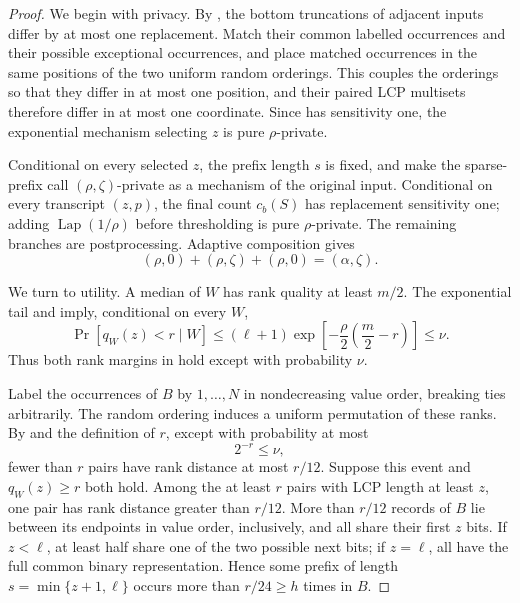 \documentclass[11pt]{article}
\begin{document}
\begin{proof}
We begin with privacy.  By , the bottom
truncations of adjacent inputs differ by at most one replacement.  Match
their common labelled occurrences and their possible exceptional
occurrences, and place matched occurrences in the same positions of the two
uniform random orderings.  This couples the orderings so that they differ in
at most one position, and their paired LCP multisets therefore differ in at
most one coordinate.  Since  has sensitivity one,
the exponential mechanism selecting $z$ is pure $\rho$-private.

Conditional on every selected $z$, the prefix length $s$ is fixed, and
 make the
sparse-prefix call
$(\rho,\zeta)$-private as a mechanism of the original input.  Conditional on
every transcript $(z,p)$, the final count $c_b(S)$ has replacement
sensitivity one; adding $\operatorname{Lap}(1/\rho)$ before thresholding is
pure $\rho$-private.  The remaining branches are postprocessing.  Adaptive
composition gives
\begin{equation}
 (\rho,0)+(\rho,\zeta)+(\rho,0)=(\alpha,\zeta).
 \label{eq:one-level-composition}
\end{equation}

We turn to utility.  A median of $W$ has rank quality at least $m/2$.
The exponential tail  and
 imply,
conditional on every $W$,
\begin{equation}
 \Pr[q_W(z)<r\mid W]
 \le(\ell+1)
   \exp\left[-\frac\rho2\left(\frac m2-r\right)\right]
 \le\nu.
 \label{eq:robust-em-utility}
\end{equation}
Thus both rank margins in  hold except with
probability $\nu$.

Label the occurrences of $B$ by $1,\ldots,N$ in nondecreasing value order,
breaking ties arbitrarily.  The random ordering induces a uniform
permutation of these ranks.  By  and the definition of
$r$, except with probability at most
\begin{equation}
 2^{-r}\le\nu,
 \label{eq:pairing-failure}
\end{equation}
fewer than $r$ pairs have rank distance at most $r/12$.  Suppose this event
and $q_W(z)\ge r$ both hold.  Among the at least $r$ pairs with LCP length at
least $z$, one pair has rank distance greater than $r/12$.  More than
$r/12$ records of $B$ lie between its endpoints in value order, inclusively,
and all share their first $z$ bits.  If $z<\ell$, at least half share one of
the two possible next bits; if $z=\ell$, all have the full common binary
representation.  Hence some prefix of length
$s=\min\{z+1,\ell\}$ occurs more than $r/24\ge h$ times in $B$.


\end{proof}
\end{document}
